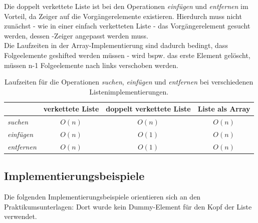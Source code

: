 \noindent
Die doppelt verkettete Liste ist bei den Operationen \textit{einfügen} und \textit{entfernen} im Vorteil, da Zeiger auf die Vorgängerelemente existieren.
Hierdurch muss nicht zunächst - wie in einer einfach verketteten Liste - das Vorgängerelement gesucht werden, dessen -Zeiger angepasst werden muss.\\
Die Laufzeiten in der Array-Implementierung sind dadurch bedingt, dass Folgeelemente geshifted werden müssen - wird bspw. das erste Element gelöscht, müssen n-1 Folgeelemente nach links verschoben werden.

\setlength{\tabcolsep}{1.5em}
\renewcommand{\arraystretch}{1.5}%
\begin{table} %
    \centering
    \begin{tabular}{|l | c | c | c|}
        \hline
                            & verkettete Liste & doppelt verkettete Liste & Liste als Array \\
        \hline
        \textit{suchen}     &    $O(n) $    &    $O(n)$      & $O(n)$ \\
        \hline
        \textit{einfügen}   &    $O(n) $    &    $O(1)$      & $O(n)$ \\
        \hline
        \textit{entfernen}  &    $O(n) $    &    $O(1)$     &  $O(n)$\\
        \hline
    \end{tabular}
    \caption{Laufzeiten für die Operationen \textit{suchen}, \textit{einfügen} und \textit{entfernen} bei verschiedenen Listenimplementierungen.}
    \label{tab:listruntime}
\end{table}


\subsection{Implementierungsbeispiele}

Die folgenden Implementierungsbeispiele orientieren sich an den Praktikumsunterlagen: Dort wurde kein Dummy-Element für
den Kopf der Liste verwendet.

